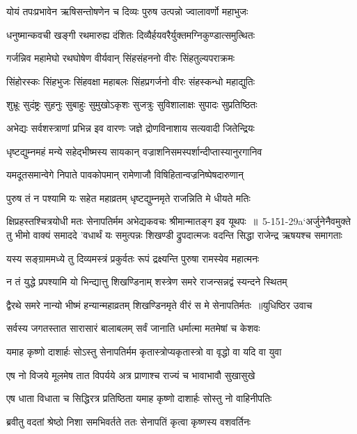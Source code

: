 \twolineshloka
{योयं तपःप्रभावेन ऋषिसन्तोषणेन च}
{दिव्यः पुरुष उत्पन्नो ज्वालावर्णो महाभुजः}


\twolineshloka
{धनुष्मान्कवची खङ्गी रथमारुह्य दंशितः}
{दिव्यैर्हयवरैर्युक्तमग्निकुण्डात्समुत्थितः}


\twolineshloka
{गर्जन्निव महामेघो रथघोषेण वीर्यवान्}
{सिंहसंहननो वीरः सिंहतुल्यपराक्रमः}


\twolineshloka
{सिंहोरस्कः सिंहभुजः सिंहवक्षा महाबलः}
{सिंहप्रगर्जनो वीरः संहस्कन्धो महाद्युतिः}


\twolineshloka
{शुभ्रूः सुदंष्ट्रः सुहनुः सुबाहुः सुमुखोऽकृशः}
{सुजत्रुः सुविशालाक्षः सुपादः सुप्रतिष्ठितः}


\twolineshloka
{अभेद्यः सर्वशस्त्राणां प्रभिन्न इव वारणः}
{जज्ञे द्रोणविनाशाय सत्यवादी जितेन्द्रियः}


\twolineshloka
{धृष्टद्युम्नमहं मन्ये सहेद्भीष्मस्य सायकान्}
{वज्राशनिसमस्पर्शान्दीप्तास्यानुरगानिव}


\twolineshloka
{यमदूतसमान्वेगे निपाते पावकोपमान्}
{रामेणाजौ विषिहितान्वज्रनिष्पेषदारुणान्}


\twolineshloka
{पुरुष तं न पश्यामि यः सहेत महाव्रतम्}
{धृष्टद्युम्नमृते राजन्निति मे धीयते मतिः}


\fourlineindentedshloka
{क्षिप्रहस्तश्चित्रयोधी मतः सेनापतिर्मम}
{अभेद्यकवचः श्रीमान्मातङ्ग इव यूथपः ॥ 5-151-29a`अर्जुनेनैवमुक्ते तु भीमो वाक्यं समाददे}
{'वधार्थं यः समुत्पन्नः शिखण्डी द्रुपदात्मजः}
{वदन्ति सिद्धा राजेन्द्र ऋषयश्च समागताः}


\twolineshloka
{यस्य सङ्ग्राममध्ये तु दिव्यमस्त्रं प्रकुर्वतः}
{रूपं द्रक्ष्यन्ति पुरुषा रामस्येव महात्मनः}


\twolineshloka
{न तं युद्धे प्रपश्यामि यो भिन्द्यात्तु शिखण्डिनाम्}
{शस्त्रेण समरे राजन्सन्नद्वं स्यन्दने स्थितम्}


\threelineshloka
{द्वैरथे समरे नान्यो भीष्मं हन्यान्महाव्रतम्}
{शिखण्डिनमृते वीरं स मे सेनापतिर्मतः ॥युधिष्ठिर उवाच}
{}


\twolineshloka
{सर्वस्य जगतस्तात सारासारं बालाबलम्}
{सर्वं जानाति धर्मात्मा मतमेषां च केशवः}


\twolineshloka
{यमाह कृष्णो दाशार्हः सोऽस्तु सेनापतिर्मम}
{कृतास्त्रोप्यकृतास्त्रो वा वृद्धो वा यदि वा युवा}


\twolineshloka
{एष नो विजये मूलमेष तात विपर्यये}
{अत्र प्राणाश्च राज्यं च भावाभावौ सुखासुखे}


\twolineshloka
{एष धाता विधाता च सिद्धिरत्र प्रतिष्ठिता}
{यमाह कृष्णो दाशार्हः सोस्तु नो वाहिनीपतिः}


\twolineshloka
{ब्रवीतु वदतां श्रेष्ठो निशा समभिवर्तते}
{ततः सेनापतिं कृत्वा कृष्णस्य वशवर्तिनः}


